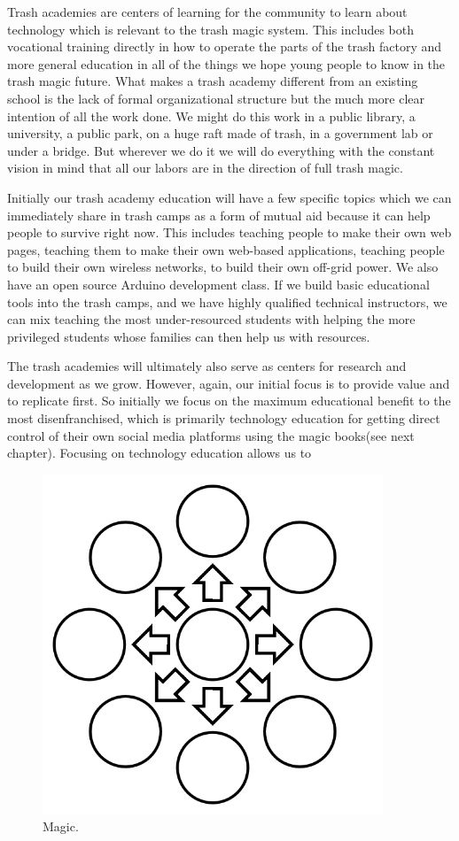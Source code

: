 Trash academies are centers of learning for the community to learn about technology which is relevant to the trash magic system.  This includes both vocational training directly in how to operate the parts of the trash factory and more general education in all of the things we hope young people to know in the trash magic future.  What makes a trash academy different from an existing school is the lack of formal organizational structure but the much more clear intention of all the work done.  We might do this work in a public library, a university, a public park, on a huge raft made of trash, in a government lab or under a bridge. But wherever we do it we will do everything with the constant vision in mind that all our labors are in the direction of full trash magic.

Initially our trash academy education will have a few specific topics which we can immediately share in trash camps as a form of mutual aid because it can help people to survive right now.  This includes teaching people to make their own web pages, teaching them to make their own web-based applications, teaching people to build their own wireless networks, to build their own off-grid power.  We also have an open source Arduino development class.  If we build basic educational tools into the trash camps, and we have highly qualified technical instructors, we can mix teaching the most under-resourced students with helping the more privileged students whose families can then help us with resources.  

The trash academies will ultimately also serve as centers for research and development as we grow.  However, again, our initial focus is to provide value and to replicate first.  So initially we focus on the maximum educational benefit to the most disenfranchised, which is primarily technology education for getting direct control of their own social media platforms using the magic books(see next chapter).  Focusing on technology education allows us to 

\begin{figure}
	\centering
	\includegraphics[width=4in]{imageserver/uploadimages/image12.png}
	\caption{Magic.}
\end{figure}

